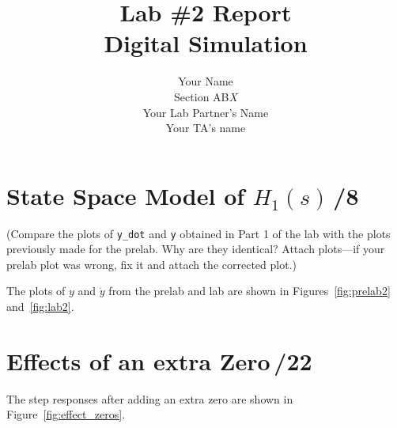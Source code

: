 \documentclass{article}
\newcommand{\score}{\hfill \underline{\hspace{0.65cm}}\,/} %
\begin{document}
\title{\bf Lab \#2 Report\\{\sc Digital Simulation}}
\author{Your Name\\ Section AB\emph{X}\\
  Your Lab Partner's Name\\
  Your TA's name}
\maketitle
\noindent {}
\section{{\sc State Space Model of} $H_1(s)$\score 8}
(Compare the plots of \verb|y_dot| and \verb|y| obtained in Part 1 of the lab with the plots previously made for the prelab. Why are they identical? Attach plots---if your prelab plot was wrong, fix it and attach the corrected plot.)

\noindent The plots of $y$ and $\dot{y}$ from the prelab and lab are shown in Figures~\ref{fig:prelab2} and~\ref{fig:lab2}.



\section{{\sc Effects of an extra Zero}\score 22}
The step responses after adding an extra zero are shown in Figure~\ref{fig:effect_zeros}.
\end{document}
